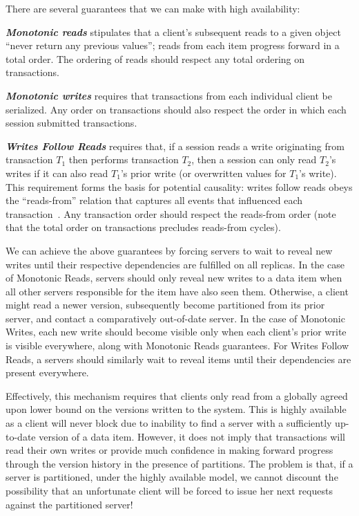 There are several guarantees that we can make with high availability:

\vspace{.5em}\noindent\textit{\textbf{Monotonic reads}} stipulates
that a client's subsequent reads to a given object ``never return any
previous values''; reads from each item progress forward in a total
order. The ordering of reads should respect any total ordering on
transactions.

\vspace{.5em}\noindent\textit{\textbf{Monotonic writes}} requires
that transactions from each individual client be serialized. Any order
on transactions should also respect the order in which each session
submitted transactions.

\vspace{.5em}\noindent\textit{\textbf{Writes Follow Reads}} requires
that, if a session reads a write originating from transaction $T_1$
then performs transaction $T_2$, then a session can only read $T_2$'s
writes if it can also read $T_1$'s prior write (or overwritten values
for $T_1$'s write). This requirement forms the basis for potential
causality: writes follow reads obeys the ``reads-from'' relation that
captures all events that influenced each
transaction~\cite{causalmemory}. Any transaction order should respect
the reads-from order (note that the total order on transactions
precludes reads-from cycles).\vspace{.5em}

We can achieve the above guarantees by forcing servers to wait to
reveal new writes until their respective dependencies are fulfilled on
all replicas. In the case of Monotonic Reads, servers should only
reveal new writes to a data item when all other servers responsible
for the item have also seen them. Otherwise, a client might read a
newer version, subsequently become partitioned from its prior server,
and contact a comparatively out-of-date server. In the case of
Monotonic Writes, each new write should become visible only when each
client's prior write is visible everywhere, along with Monotonic Reads
guarantees. For Writes Follow Reads, a servers should similarly wait
to reveal items until their dependencies are present everywhere.

Effectively, this mechanism requires that clients only read from a
globally agreed upon lower bound on the versions written to the
system. This is highly available as a client will never block
due to inability to find a server with a sufficiently up-to-date
version of a data item. However, it does not imply that transactions
will read their own writes or provide much confidence in making
forward progress through the version history in the presence of
partitions. The problem is that, if a server is partitioned, under the
highly available model, we cannot discount the possibility that an
unfortunate client will be forced to issue her next requests against
the partitioned server!

